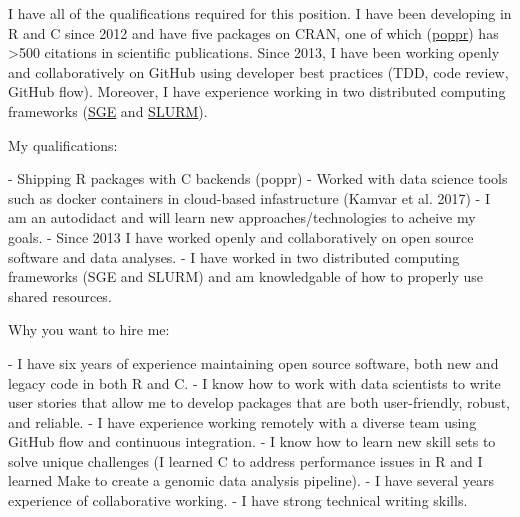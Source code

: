 \vspace{1ex}

I have all of the qualifications required for this position. I have been 
developing in R and C since 2012 and have five packages on CRAN, one of which
(\href{https://grunwaldlab.github.io/poppr}{poppr}) has \textgreater500
citations in scientific publications. Since 2013, I have been working openly and
collaboratively on GitHub using developer best practices (TDD, code review, 
GitHub flow). Moreover, I have experience working in two distributed computing
frameworks (\href{https://github.com/zkamvar/clonal-inference-simulations}{SGE}
and \href{https://github.com/zkamvar/read-processing}{SLURM}).

\vspace{1ex}


My qualifications: 

 - Shipping R packages with C backends (poppr)
 - Worked with data science tools such as docker containers in cloud-based infastructure (Kamvar et al. 2017)
 - I am an autodidact and will learn new approaches/technologies to acheive my goals.
 - Since 2013 I have worked openly and collaboratively on open source software and data analyses. 
 - I have worked in two distributed computing frameworks (SGE and SLURM) and am knowledgable of how to properly use shared resources.





Why you want to hire me:

 - I have six years of experience maintaining open source software, both new and
   legacy code in both R and C.
 - I know how to work with data scientists to write user stories that allow me
   to develop packages that are both user-friendly, robust, and reliable.
 - I have experience working remotely with a diverse team using GitHub flow and 
   continuous integration.
 - I know how to learn new skill sets to solve unique challenges (I learned C
   to address performance issues in R and I learned Make to create a genomic
   data analysis pipeline).
 - I have several years experience of collaborative working.
 - I have strong technical writing skills.


